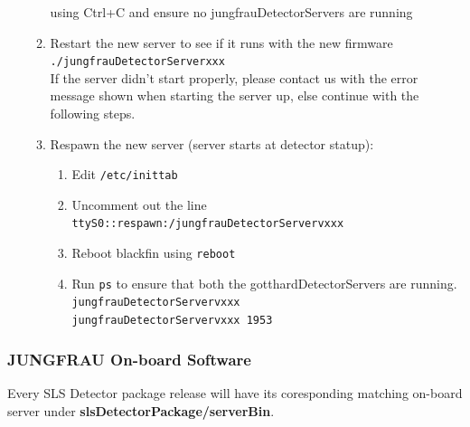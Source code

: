 \documentclass{article}
\begin{document}
\begin{enumerate}
\begin{enumerate}
using Ctrl+C and ensure no jungfrauDetectorServers are
running
    \item Restart the new server to see if it runs with the new firmware \\
\verb=./jungfrauDetectorServerxxx= \\
If the server didn't start properly, please contact us with the error message
shown when starting the server up, else continue with the following steps.
    \item Respawn the new server (server starts at detector statup): 
    \begin{enumerate}
      \item Edit \verb=/etc/inittab= 
      \item Uncomment out the line
\verb=ttyS0::respawn:/jungfrauDetectorServervxxx= 
      \item Reboot blackfin using \verb=reboot=
      \item Run \verb=ps= to ensure that both the gotthardDetectorServers are
running.\\
\verb=jungfrauDetectorServervxxx= \\
\verb=jungfrauDetectorServervxxx 1953=
    \end{enumerate}
  \end{enumerate}

\end{enumerate}



\subsubsection{JUNGFRAU On-board Software}
Every SLS Detector package release will have its coresponding matching on-board
server under \textbf{slsDetectorPackage/serverBin}.
\end{document}
